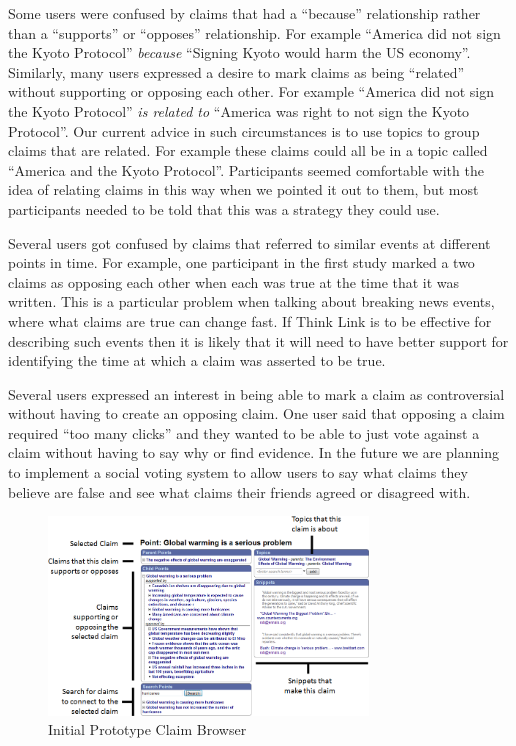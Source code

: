 \documentclass{chi2009}
\begin{document}
Some users were confused by claims that had a ``because'' relationship rather than a ``supports'' or ``opposes'' relationship. For example ``America did not sign the Kyoto Protocol'' {\it because} ``Signing Kyoto would harm the US economy''. Similarly, many users expressed a desire to mark claims as being ``related'' without supporting or opposing each other. For example ``America did not sign the Kyoto Protocol'' {\it is related to} ``America was right to not sign the Kyoto Protocol''. Our current advice in such circumstances is to use topics to group claims that are related. For example these claims could all be in a topic called ``America and the Kyoto Protocol''. Participants seemed comfortable with the idea of relating claims in this way when we pointed it out to them, but most participants needed to be told that this was a strategy they could use.

Several users got confused by claims that referred to similar events at different points in time. For example, one participant in the first study marked a two claims as opposing each other when each was true at the time that it was written. This is a particular problem when talking about breaking news events, where what claims are true can change fast. If Think Link is to be effective for describing such events then it is likely that it will need to have better support for identifying the time at which a claim was asserted to be true.

Several users expressed an interest in being able to mark a claim as controversial without having to create an opposing claim. One user said that opposing a claim required ``too many clicks'' and they wanted to be able to just vote against a claim without having to say why or find evidence. In the future we are planning to implement a social voting system to allow users to say what claims they believe are false and see what claims their friends agreed or disagreed with.

\begin{figure}[tb]
	\includegraphics[width=8.5cm]{../screenshots/oldpoint_diagram.png}
	\caption{Initial Prototype Claim Browser}
	\label{oldbrowser}
\end{figure}
\end{document}
